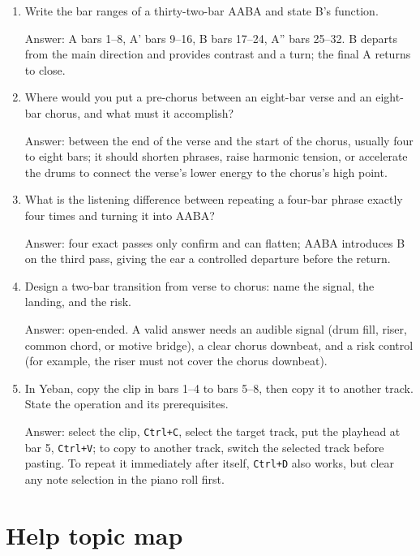 \begin{exercise}
\begin{enumerate}
  \item Write the bar ranges of a thirty-two-bar AABA and state B's function.
  \par\noindent Answer: A bars 1--8, A' bars 9--16, B bars 17--24, A'' bars 25--32. B departs from the main direction and provides contrast and a turn; the final A returns to close.
  \item Where would you put a pre-chorus between an eight-bar verse and an eight-bar chorus, and what must it accomplish?
  \par\noindent Answer: between the end of the verse and the start of the chorus, usually four to eight bars; it should shorten phrases, raise harmonic tension, or accelerate the drums to connect the verse's lower energy to the chorus's high point.
  \item What is the listening difference between repeating a four-bar phrase exactly four times and turning it into AABA?
  \par\noindent Answer: four exact passes only confirm and can flatten; AABA introduces B on the third pass, giving the ear a controlled departure before the return.
  \item Design a two-bar transition from verse to chorus: name the signal, the landing, and the risk.
  \par\noindent Answer: open-ended. A valid answer needs an audible signal (drum fill, riser, common chord, or motive bridge), a clear chorus downbeat, and a risk control (for example, the riser must not cover the chorus downbeat).
  \item In Yeban, copy the clip in bars 1--4 to bars 5--8, then copy it to another track. State the operation and its prerequisites.
  \par\noindent Answer: select the clip, \texttt{Ctrl+C}, select the target track, put the playhead at bar 5, \texttt{Ctrl+V}; to copy to another track, switch the selected track before pasting. To repeat it immediately after itself, \texttt{Ctrl+D} also works, but clear any note selection in the piano roll first.
\end{enumerate}
\end{exercise}

\section{Help topic map}

